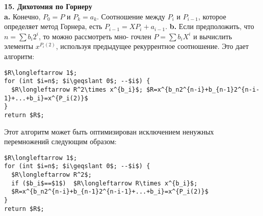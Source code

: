 \noindent\textbf{15. Дихотомия по Горнеру}\\

\hspace*{15pt}\textbf{a.} Конечно, $P_0=P$ и $P_k=a_k$. Соотношение между $P_i$ и $P_{i-1}$,\linebreak
которое определяет метод Горнера, есть $P_{i-1}=X P_i+a_{i-1}$.\newline
\hspace*{15pt}\textbf{b.} Если предположить, что $n=\sum b_i2^i$, то можно рассмотреть мно-\linebreak
гочлен $P=\sum b_iX^i$ и вычислить элементы $x^{P_i(2)}$, используя предыдущее\linebreak
рекуррентное соотношение. Это дает алгоритм:
\begin{lstlisting}[xleftmargin=15pt, mathescape=true]
$R\longleftarrow 1$;
for (int $i=n$; $i\geqslant 0$; --$i$) {
  $R\longleftarrow R^2\times x^{b_i}$; $R=x^{b_n2^{n-i}+b_{n-1}2^{n-i-1}+...+b_i}=x^{P_i(2)}$
}
return $R$;
\end{lstlisting}
Этот алгоритм может быть оптимизирован исключением ненужных\linebreak
перемножений следующим образом:
\begin{lstlisting}[xleftmargin=15pt, mathescape=true]
$R\longleftarrow 1$;
for (int $i=n$; $i\geqslant 0$; --$i$) {
  $R\longleftarrow R^2$;
  if ($b_i$==$1$)  $R\longleftarrow R\times x^{b_i}$;
  $R=x^{b_n2^{n-i}+b_{n-1}2^{n-i-1}+...+b_i}=x^{P_i(2)}$
}
return $R$;
\end{lstlisting}


